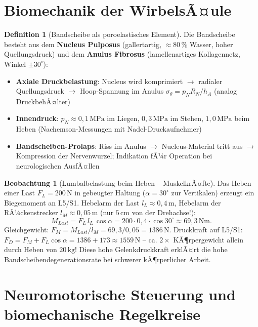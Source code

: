 ﻿\documentclass[a4paper,12pt]{report}
\theoremstyle{definition}
\newtheorem{definition}{Definition}
\newtheorem{beobachtung}{Beobachtung}
\begin{document}
\section{Biomechanik der WirbelsÃ¤ule}

\begin{definition}[Bandscheibe als poroelastisches Element]
Die Bandscheibe besteht aus dem \textbf{Nucleus Pulposus} (gallertartig,
$\approx 80\,\%$ Wasser, hoher Quellungsdruck) und dem \textbf{Anulus Fibrosus}
(lamellenartiges Kollagennetz, Winkel $\pm 30^\circ$):
\begin{itemize}
    \item[-] \textbf{Axiale Druckbelastung}: Nucleus wird komprimiert
          $\to$ radialer Quellungsdruck $\to$ Hoop-Spannung im Anulus
          $\sigma_\theta = p_N R_N / h_A$ (analog DruckbehÃ¤lter)
    \item[-] \textbf{Innendruck}: $p_N \approx 0{,}1\,\mathrm{MPa}$ im Liegen,
          $0{,}3\,\mathrm{MPa}$ im Stehen, $1{,}0\,\mathrm{MPa}$ beim Heben
          (Nachemson-Messungen mit Nadel-Druckaufnehmer)
    \item[-] \textbf{Bandscheiben-Prolaps}: Riss im Anulus $\to$ Nucleus-Material
          tritt aus $\to$ Kompression der Nervenwurzel; Indikation fÃ¼r Operation
          bei neurologischen AusfÃ¤llen
\end{itemize}
\end{definition}

\begin{beobachtung}[Lumbalbelastung beim Heben -- MuskelkrÃ¤fte]
Das Heben einer Last $F_L = 200\,\mathrm{N}$ in gebeugter Haltung
($\alpha = 30^\circ$ zur Vertikalen) erzeugt ein Biegemoment an L5/S1.
Hebelarm der Last $l_L \approx 0{,}4\,\mathrm{m}$, Hebelarm der RÃ¼ckenstrecker
$l_M \approx 0{,}05\,\mathrm{m}$ (nur $5\,\mathrm{cm}$ von der Drehachse!):
\[
  M_{Last} = F_L\,l_L\,\cos\alpha = 200\cdot0{,}4\cdot\cos30^\circ \approx 69{,}3\,\mathrm{Nm}.
\]
Gleichgewicht: $F_M = M_{Last}/l_M = 69{,}3/0{,}05 = 1386\,\mathrm{N}$.
Druckkraft auf L5/S1: $F_D = F_M + F_L\cos\alpha = 1386 + 173 \approx 1559\,\mathrm{N}$
-- ca. $2\times$ KÃ¶rpergewicht allein durch Heben von $20\,\mathrm{kg}$!
Diese hohe Gelenkdruckkraft erklÃ¤rt die hohe Bandscheibendegenerationsrate
bei schwerer kÃ¶rperlicher Arbeit.
\end{beobachtung}

\section{Neuromotorische Steuerung und biomechanische Regelkreise}
\end{document}
